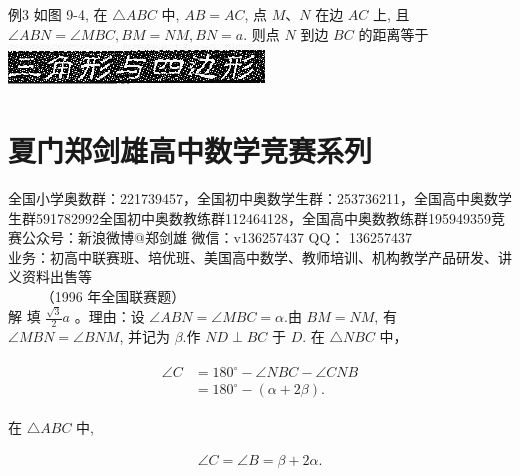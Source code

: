 \documentclass[10pt]{article}
\begin{document}
例3 如图 9-4, 在 $\triangle A B C$ 中, $A B=A C$, 点 $M 、 N$ 在边 $A C$ 上, 且 $\angle A B N=\angle M B C, B M=N M, B N=a$. 则点 $N$ 到边 $B C$ 的距离等于 $\qquad$\\
\includegraphics[max width=\textwidth, center]{2024_10_30_2c8f45efd4a519b08e1ag-090}

\section*{夏门郑剑雄高中数学竞赛系列}
全国小学奥数群：221739457，全国初中奥数学生群：253736211，全国高中奥数学生群591782992全国初中奥数教练群112464128，全国高中奥数教练群195949359竞赛公众号：新浪微博@郑剑雄 微信：v136257437 QQ： 136257437\\
业务：初高中联赛班、培优班、美国高中数学、教师培训、机构教学产品研发、讲义资料出售等\\
$\qquad$ （1996 年全国联赛题）\\
解 填 $\frac{\sqrt{3}}{2} a$ 。理由：设 $\angle A B N=\angle M B C=\alpha$.由 $B M=N M$, 有 $\angle M B N=\angle B N M$, 并记为 $\beta$.作 $N D \perp B C$ 于 $D$. 在 $\triangle N B C$ 中，

\begin{align*}
\begin{aligned}
\angle C & =180^{\circ}-\angle N B C-\angle C N B \\
& =180^{\circ}-(\alpha+2 \beta) .
\end{aligned}
\end{align*}

在 $\triangle A B C$ 中,

\begin{align*}
\angle C=\angle B=\beta+2 \alpha .
\end{align*}
\end{document}
